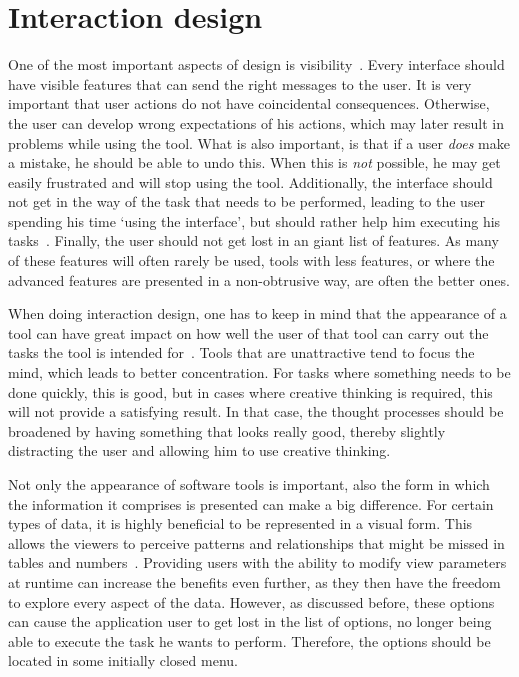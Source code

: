 \section{Interaction design}
One of the most important aspects of design is visibility~\cite{norman2002design}. Every interface should have visible features that can send the right messages to the user. It is very important that user actions do not have coincidental consequences. Otherwise, the user can develop wrong expectations of his actions, which may later result in problems while using the tool. What is also important, is that if a user \emph{does} make a mistake, he should be able to undo this. When this is \emph{not} possible, he may get easily frustrated and will stop using the tool. Additionally, the interface should not get in the way of the task that needs to be performed, leading to the user spending his time `using the interface', but should rather help him executing his tasks~\cite{norman1990interfaces}. Finally, the user should not get lost in an giant list of features. As many of these features will often rarely be used, tools with less features, or where the advanced features are presented in a non-obtrusive way, are often the better ones.

When doing interaction design, one has to keep in mind that the appearance of a tool can have great impact on how well the user of that tool can carry out the tasks the tool is intended for~\cite{norman2002emotion}. Tools that are unattractive tend to focus the mind, which leads to better concentration. For tasks where something needs to be done quickly, this is good, but in cases where creative thinking is required, this will not provide a satisfying result. In that case, the thought processes should be broadened by having something that looks really good, thereby slightly distracting the user and allowing him to use creative thinking.

Not only the appearance of software tools is important, also the form in which the information it comprises is presented can make a big difference. For certain types of data, it is highly beneficial to be represented in a visual form. This allows the viewers to perceive patterns and relationships that might be missed in tables and numbers~\cite{gallopoulos1994computer}. Providing users with the ability to modify view parameters at runtime can increase the benefits even further, as they then have the freedom to explore every aspect of the data. However, as discussed before, these options can cause the application user to get lost in the list of options, no longer being able to execute the task he wants to perform. Therefore, the options should be located in some initially closed menu.

